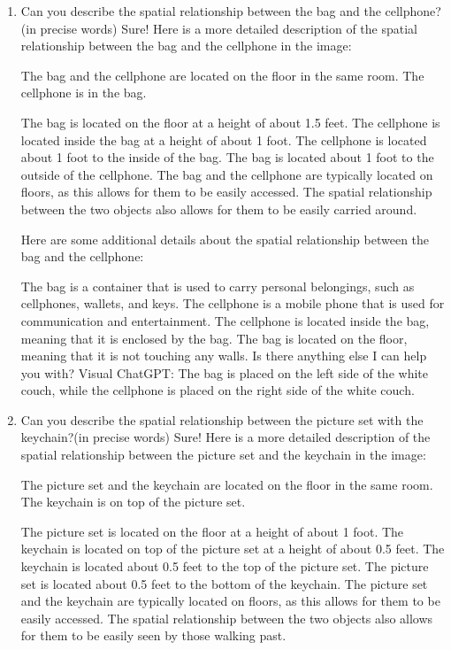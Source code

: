 \begin{enumerate}
    \item Can you describe the spatial relationship between the bag and the cellphone?(in precise words)
    \subitem Sure! Here is a more detailed description of the spatial relationship between the bag and the cellphone in the image:

    The bag and the cellphone are located on the floor in the same room. The cellphone is in the bag.
    
    The bag is located on the floor at a height of about 1.5 feet.
    The cellphone is located inside the bag at a height of about 1 foot.
    The cellphone is located about 1 foot to the inside of the bag.
    The bag is located about 1 foot to the outside of the cellphone.
    The bag and the cellphone are typically located on floors, as this allows for them to be easily accessed. The spatial relationship between the two objects also allows for them to be easily carried around.
    
    Here are some additional details about the spatial relationship between the bag and the cellphone:
    
    The bag is a container that is used to carry personal belongings, such as cellphones, wallets, and keys.
    The cellphone is a mobile phone that is used for communication and entertainment.
    The cellphone is located inside the bag, meaning that it is enclosed by the bag.
    The bag is located on the floor, meaning that it is not touching any walls.
    Is there anything else I can help you with?
    \subitem Visual ChatGPT: The bag is placed on the left side of the white couch, while the cellphone is placed on the right side of the white couch.
    \item Can you describe the spatial relationship between the picture set with the keychain?(in precise words)
    \subitem Sure! Here is a more detailed description of the spatial relationship between the picture set and the keychain in the image:

    The picture set and the keychain are located on the floor in the same room. The keychain is on top of the picture set.
    
    The picture set is located on the floor at a height of about 1 foot.
    The keychain is located on top of the picture set at a height of about 0.5 feet.
    The keychain is located about 0.5 feet to the top of the picture set.
    The picture set is located about 0.5 feet to the bottom of the keychain.
    The picture set and the keychain are typically located on floors, as this allows for them to be easily accessed. The spatial relationship between the two objects also allows for them to be easily seen by those walking past.
    

\end{enumerate}

